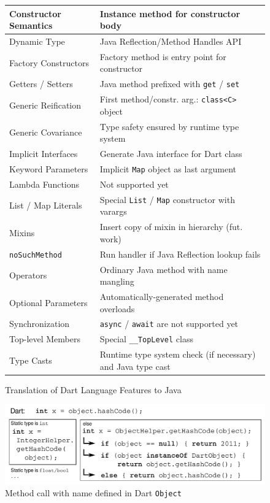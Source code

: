 \documentclass[sigplan]{acmart}
\begin{document}
\begin{figure}[!tp]
\footnotesize
\begin{tabularx}{\columnwidth}{|l|X|}
\hline \hline
Constructor Semantics & Instance method for constructor body \\ \hline
Dynamic Type & Java Reflection/Method Handles API \\ \hline
Factory Constructors & Factory method is entry point for constructor \\ \hline
Getters / Setters & Java method prefixed with \texttt{get} / \texttt{set} \\ \hline
Generic Reification & First method/constr. arg.: \texttt{class<C>} object \\ \hline
Generic Covariance & Type safety ensured by runtime type system \\ \hline
Implicit Interfaces & Generate Java interface for Dart class \\ \hline
Keyword Parameters & Implicit \texttt{Map} object as last argument \\ \hline
Lambda Functions & Not supported yet \\ \hline
List / Map Literals & Special \texttt{List} / \texttt{Map} constructor with varargs \\ \hline
Mixins & Insert copy of mixin in hierarchy (fut. work) \\ \hline
\texttt{noSuchMethod} & Run handler if Java Reflection lookup fails \\ \hline
Operators & Ordinary Java method with name mangling \\ \hline
Optional Parameters & Automatically-generated method overloads \\ \hline
Synchronization & \texttt{async} / \texttt{await} are not supported yet \\ \hline
Top-level Members & Special \texttt{\_\_TopLevel} class \\ \hline
Type Casts & Runtime type system check (if necessary) and Java type cast \\
\hline \hline
\end{tabularx}
    \caption{Translation of Dart Language Features to Java}
    \label{fig:translation_overview}
\end{figure}
\begin{figure}[!tp]
\includegraphics[width=\columnwidth]{helper_class.pdf}
    \caption{Method call with name defined in Dart \texttt{Object}}
    \label{fig:helper_object}
\end{figure}
\end{document}
